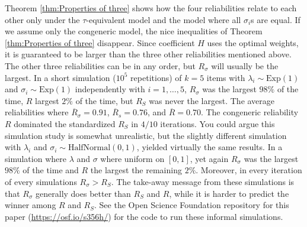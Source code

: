 \documentclass[twoside]{article}
\begin{document}
Theorem \ref{thm:Properties of three} shows how the four reliabilities relate to each other only under the $\tau$-equivalent model and the model where all $\sigma_i$s are equal. If we assume only the congeneric model, the nice inequalities of Theorem \ref{thm:Properties of three} disappear. Since coefficient $H$ uses the optimal weights, it is guaranteed to be larger than the three other reliabilities mentioned above. The
other three reliabilities can be in any order, but
$ R_{\sigma}$ will usually be the largest. In a short
simulation ($10^{5}$ repetitions) of $k=5$ items with $\lambda_{i}\sim \textrm{Exp}(1)$
and $\sigma_{i}\sim \textrm{Exp}(1)$ independently with $i=1,\ldots,5$, $ R_{\sigma}$
was the largest $98\%$ of the time, $ R$ largest $2\%$
of the time, but $ R_{S}$ was never the largest. The average reliabilities where $\overline{ R}_\sigma = 0.91$, $\overline{ R}_s= 0.76$, and $\overline{ R} = 0.70$.
The congeneric reliability $ R$ dominated the standardized $ R_{S}$ in $4/10$ iterations. You could argue this simulation study
is somewhat unrealistic, but the slightly different simulation with $\lambda_{i}$ and $\sigma_{i}\sim \textrm{HalfNormal}(0,1)$, yielded virtually the same results. In a simulation where $\lambda$ and $\sigma$ where uniform on $[0,1]$, yet again $ R_{\sigma}$
was the largest $98\%$ of the time and $ R$ the largest the remaining $2\%$. Moreover, in every iteration of every simulations $ R_\sigma >  R_S$. The take-away message from these simulations is that $ R_\sigma$ generally does better than $ R_{S}$ and
$ R$, while it is harder to predict the winner among $ R$
and $ R_{S}$. See the Open Science Foundation repository for this paper (\url{https://osf.io/s356h/}) for the code to run these informal simulations.
\end{document}
